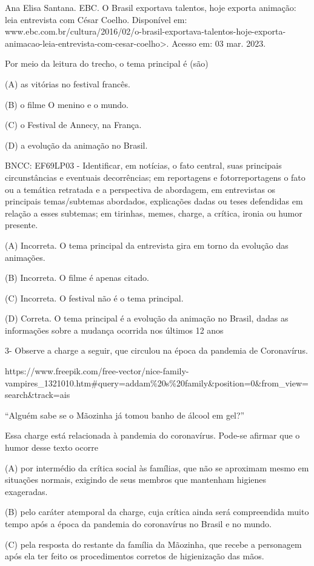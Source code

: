 \begin{itemize}
\begin{itemize}
Ana Elisa Santana. EBC. O Brasil exportava talentos, hoje exporta
animação: leia entrevista com César Coelho. Disponível em:
www.ebc.com.br/cultura/2016/02/o-brasil-exportava-talentos-hoje-exporta-animacao-leia-entrevista-com-cesar-coelho\textgreater{}.
Acesso em: 03 mar. 2023.

Por meio da leitura do trecho, o tema principal é (são)

(A) as vitórias no festival francês.

(B) o filme O menino e o mundo.

(C) o Festival de Annecy, na França.

(D) a evolução da animação no Brasil.

BNCC: EF69LP03 - Identificar, em notícias, o fato central, suas
principais circunstâncias e eventuais decorrências; em reportagens e
fotorreportagens o fato ou a temática retratada e a perspectiva de
abordagem, em entrevistas os principais temas/subtemas abordados,
explicações dadas ou teses defendidas em relação a esses subtemas; em
tirinhas, memes, charge, a crítica, ironia ou humor presente.

(A) Incorreta. O tema principal da entrevista gira em torno da evolução
das animações.

(B) Incorreta. O filme é apenas citado.

(C) Incorreta. O festival não é o tema principal.

(D) Correta. O tema principal é a evolução da animação no Brasil, dadas
as informações sobre a mudança ocorrida nos últimos 12 anos

3- Observe a charge a seguir, que circulou na época da pandemia de
Coronavírus.

https://www.freepik.com/free-vector/nice-family-vampires\_1321010.htm\#query=addam\%20s\%20family\&position=0\&from\_view=search\&track=ais

``Alguém sabe se o Mãozinha já tomou banho de álcool em gel?''

Essa charge está relacionada à pandemia do coronavírus. Pode-se afirmar
que o humor desse texto ocorre

(A) por intermédio da crítica social às famílias, que não se aproximam
mesmo em situações normais, exigindo de seus membros que mantenham
higienes exageradas.

(B) pelo caráter atemporal da charge, cuja crítica ainda será
compreendida muito tempo após a época da pandemia do coronavírus no
Brasil e no mundo.

(C) pela resposta do restante da família da Mãozinha, que recebe a
personagem após ela ter feito os procedimentos corretos de higienização
das mãos.


\end{itemize}
\end{itemize}
